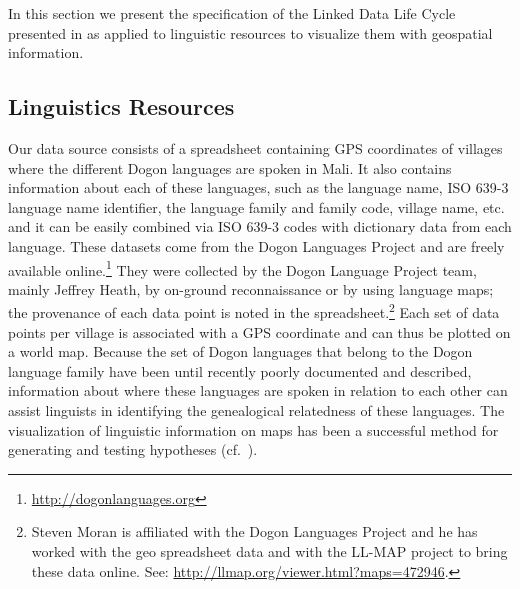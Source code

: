 In this section we present the specification of the Linked Data Life Cycle presented in \cite{Villazon_2011} as applied to linguistic resources to visualize them with geospatial information.

\subsection{Linguistics Resources}\label{sec:lr}

Our data source consists of a spreadsheet containing GPS coordinates of villages where the different Dogon languages are spoken in Mali. It also contains information about each of these languages, such as the language name, ISO 639-3 language name identifier, the language family and family code, village name, etc. and it can be easily combined via ISO 639-3 codes with dictionary data from each language. These datasets come from the Dogon Languages Project and are freely available online.\footnote{\url{http://dogonlanguages.org}} They were collected by the Dogon Language Project team, mainly Jeffrey Heath, by on-ground reconnaissance or by using language maps; the provenance of each data point is noted in the spreadsheet.\footnote{Steven Moran is affiliated with the Dogon Languages Project and he has worked with the geo spreadsheet data and with the LL-MAP project to bring these data online. See: \url{http://llmap.org/viewer.html?maps=472946}.} Each set of data points per village is associated with a GPS coordinate and can thus be plotted on a world map. Because the set of Dogon languages that belong to the Dogon language family have been until recently poorly documented and described, information about where these languages are spoken in relation to each other can assist linguists in identifying the genealogical relatedness of these languages. The visualization of linguistic information on maps has been a successful method for generating and testing hypotheses (cf.\ \cite{Haspelmath_etal2008}).


